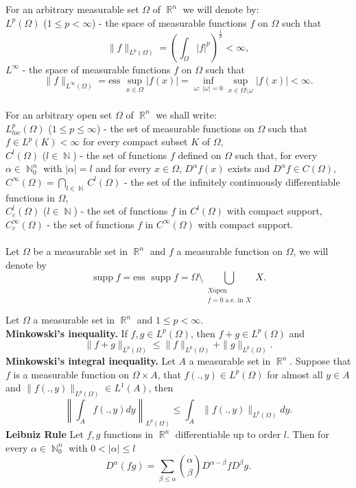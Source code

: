 \documentclass[12pt]{article}
\theoremstyle{definition}
\DeclareMathOperator\supp{supp}
\DeclareMathOperator\rr{\mathbb{R}}
\DeclareMathOperator\nn{\mathbb{N}}
\begin{document}
For an arbitrary measurable set $\Omega$ of $\rr^n$ we will denote by:\\
$L^p(\Omega)$ ($1\le p<\infty$) - the space of measurable functions $f$ on $\Omega$ such that 
\[ \|f\|_{L^p(\Omega)}=\left(\int_\Omega |f|^p\right)^\frac{1}{p}<\infty, \]
$L^\infty$ - the space of measurable functions $f$ on $\Omega$ such that
\[ \|f\|_{L^\infty(\Omega)}=\text{ess } \sup_{x \in \Omega} |f(x)|=\inf_{\omega: \  |\omega|=0} \sup_{x \in \Omega\setminus \omega} |f(x)|<\infty.\]\\
For an arbitrary open set $\Omega$ of $\rr^n$ we shall write:\\
$L^p_{loc}(\Omega) $ ($1\le p\le \infty$) - the set of measurable functions on $\Omega$ such that $f \in L^p(K)<\infty$  for every compact subset $K$ of $\Omega,$ 		\\
$C^l(\Omega)$ ($l \in \nn$) - the set of functions $f$ defined on $\Omega$ such that, for every $\alpha \in \nn_0^n$ with $|\alpha|=l$ and for every $x \in \Omega $, $D^\alpha f(x) $ exists and $D^\alpha f \in C(\Omega),$
$C^\infty(\Omega) = \bigcap_{l\in \nn} C^l(\Omega)$ - the set of the infinitely continuously differentiable functions in $\Omega$, \\ 
$C^l_c(\Omega)$ ($l \in \nn$) - the set of functions $f$ in $C^l(\Omega)$ with compact support,\\
$C^\infty_c(\Omega)$  - the set of functions $f$ in $C^\infty(\Omega)$ with compact support.\\\\
Let $\Omega$ be a measurable set in $\rr^n$ and $f$ a measurable function on $\Omega$, we will denote by
\[ \supp f= \text{ess } \supp f= \Omega \setminus \bigcup_{\substack{X \text{open} \\ f=0 \text{ a.e. in } X}} X.\]

Let $\Omega$ a measurable set in $\rr^n$ and $1\le p<\infty.$\\
\textbf{Minkowski's inequality.} If $f,g \in L^p(\Omega)$, then $f+g\in L^p(\Omega)$ and
\[ \|f+g\|_{L^p(\Omega)}\le \|f\|_{L^p(\Omega)}+\|g\|_{L^p(\Omega)}.\]
\textbf{Minkowski's integral inequality.} Let $A$ a measurable set in $\rr^n.$ Suppose that $f$ is a measurable function on $\Omega\times A$, that $f(.,y) \in L^p(\Omega)$ for almost all $y\in A$ and $\|f(.,y)\|_{L^p(\Omega)} \in L^1(A)$, then
\[ \left\| \int_A f(.,y) dy \right \|_{L^p(\Omega)} \le \int_A \|f(.,y)\|_{L^p(\Omega)}dy.\]
\textbf{Leibniz Rule} Let $f,g$ functions in $\rr^n$ differentiable up to order $l$. Then for every $\alpha \in \nn^n_0$ with $0<|\alpha|\le l$
\[ D^\alpha(fg)=\sum_{\beta \le \alpha} {\alpha \choose \beta} D^{\alpha-\beta}fD^\beta g.\]
\end{document}
